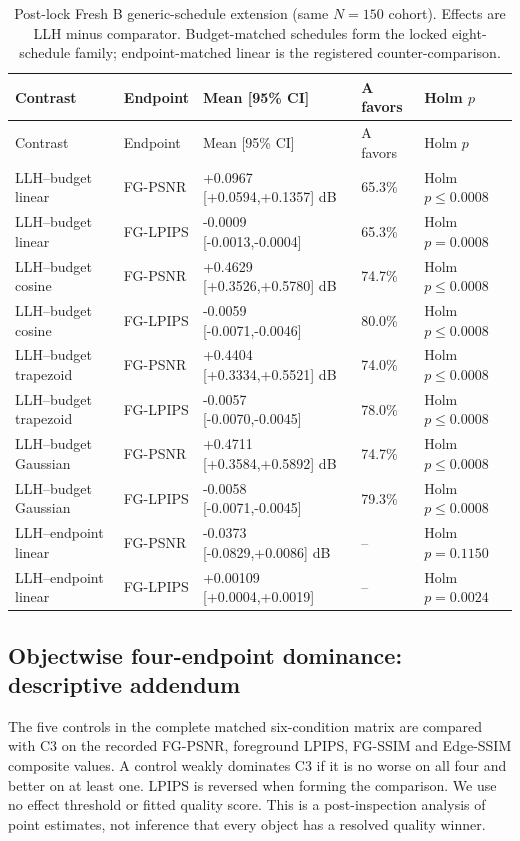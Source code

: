 \documentclass[11pt]{article}
\begin{document}
\clearpage
\begingroup\scriptsize
\begin{longtable}{p{3.4cm}p{1.7cm}p{4.4cm}p{1.3cm}p{2.4cm}}
\caption{Post-lock Fresh B generic-schedule extension (same $N=150$ cohort). Effects are LLH minus comparator. Budget-matched schedules form the locked eight-schedule family; endpoint-matched linear is the registered counter-comparison.}\label{tab:supp-generic}\\
\toprule Contrast & Endpoint & Mean [95\% CI] & A favors & Holm $p$ \\
\midrule\endfirsthead
\toprule Contrast & Endpoint & Mean [95\% CI] & A favors & Holm $p$ \\
\midrule\endhead
LLH--budget linear & FG-PSNR & +0.0967 [+0.0594,+0.1357] dB & 65.3\% & Holm $p\leq0.0008$ \\
LLH--budget linear & FG-LPIPS & -0.0009 [-0.0013,-0.0004] & 65.3\% & Holm $p=0.0008$ \\
LLH--budget cosine & FG-PSNR & +0.4629 [+0.3526,+0.5780] dB & 74.7\% & Holm $p\leq0.0008$ \\
LLH--budget cosine & FG-LPIPS & -0.0059 [-0.0071,-0.0046] & 80.0\% & Holm $p\leq0.0008$ \\
LLH--budget trapezoid & FG-PSNR & +0.4404 [+0.3334,+0.5521] dB & 74.0\% & Holm $p\leq0.0008$ \\
LLH--budget trapezoid & FG-LPIPS & -0.0057 [-0.0070,-0.0045] & 78.0\% & Holm $p\leq0.0008$ \\
LLH--budget Gaussian & FG-PSNR & +0.4711 [+0.3584,+0.5892] dB & 74.7\% & Holm $p\leq0.0008$ \\
LLH--budget Gaussian & FG-LPIPS & -0.0058 [-0.0071,-0.0045] & 79.3\% & Holm $p\leq0.0008$ \\
LLH--endpoint linear & FG-PSNR & -0.0373 [-0.0829,+0.0086] dB & -- & Holm $p=0.1150$ \\
LLH--endpoint linear & FG-LPIPS & +0.00109 [+0.0004,+0.0019] & -- & Holm $p=0.0024$ \\
\bottomrule
\end{longtable}
\endgroup

\clearpage

\FloatBarrier
\subsection*{Objectwise four-endpoint dominance: descriptive addendum}
The five controls in the complete matched six-condition matrix are compared with C3 on the recorded FG-PSNR, foreground LPIPS, FG-SSIM and Edge-SSIM composite values. A control weakly dominates C3 if it is no worse on all four and better on at least one. LPIPS is reversed when forming the comparison. We use no effect threshold or fitted quality score. This is a post-inspection analysis of point estimates, not inference that every object has a resolved quality winner.
\end{document}
